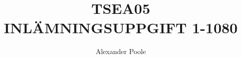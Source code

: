 
\usepackage[utf8]{inputenc}
\usepackage[T1]{fontenc}
\usepackage{ae,aecompl}
\usepackage{listings}
\usepackage{graphicx}
\usepackage{amsmath}
\usepackage{mathtools}
\usepackage{latexsym}
\usepackage{graphicx}

\setlength{\parindent}{0pt}
\setlength{\parskip}{1ex plus 0.5ex minus 0.2ex}

\newcommand{\twodigit}[1]{\ifthenelse{#1<10}{0}{}{#1}}
\newcommand{\dagensdatum}{
\number\year-\twodigit{\number\month}-\twodigit{\number\day}}

\usepackage{fancyhdr}
\pagestyle{fancy}
\cfoot{{\ } \\ \thepage}

\title{TSEA05 \\ INLÄMNINGSUPPGIFT 1-1080}
\author{Alexander Poole}

\usepackage{mdframed}
